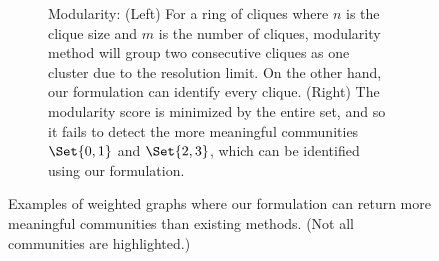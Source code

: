 \begin{figure}[h!]
\begin{subfigure}[b]{0.45\textwidth}
    \newcommand\single[2]{ %
      \foreach \x in {1,...,#2}{
        \pgfmathsetmacro{\ang}{360/#2}
        \pgfmathparse{(\x-1)*\ang}
        \node[draw,fill=red,circle,inner sep=1pt] (#1-\x) at (\pgfmathresult:4cm) {};
      }
      \foreach \x [count=\xi from 1] in {1,...,#2}{
        \foreach \y in {\x,...,#2}{
          \path (#1-\xi) edge[-] (#1-\y);
        }
      }
    }
    \centering
	 \hfill
    \caption{Modularity: (Left) For a ring of cliques where $n$ is the clique size and $m$ is the number of
	 cliques, modularity method will group two consecutive cliques as one cluster due to the resolution limit.
	 On the other hand, our formulation can identify every clique. (Right) The
	 modularity score is minimized by the entire set, and so it fails to detect the more meaningful
	 communities $\Set{0,1}$ and $\Set{2,3}$, which can be identified using our formulation.}
    \label{fig:modularity_2}
  \end{subfigure}
  \hfill
  \vspace{-.5em}
  \caption{Examples of weighted graphs where our formulation can return more meaningful communities than existing methods. (Not all communities are highlighted.)}
  \label{fig:eg_for_graphs}
\end{figure}


